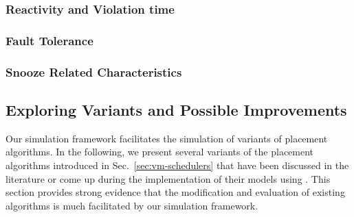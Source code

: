 %   
%


\subsubsection{Reactivity and Violation time}

\subsubsection{Fault Tolerance}
\MS[JP]{}

\subsubsection{Snooze Related Characteristics}

\subsection{Exploring Variants and Possible Improvements}


Our simulation framework facilitates the simulation of variants of
placement algorithms. In the following, we present several variants of
the placement algorithms introduced in Sec.~\ref{sec:vm-schedulers}
that have been discussed in the literature or come up during the
implementation of their models using \vmps. This section provides
strong evidence that the modification and evaluation of existing
algorithms is much facilitated by our simulation framework.




